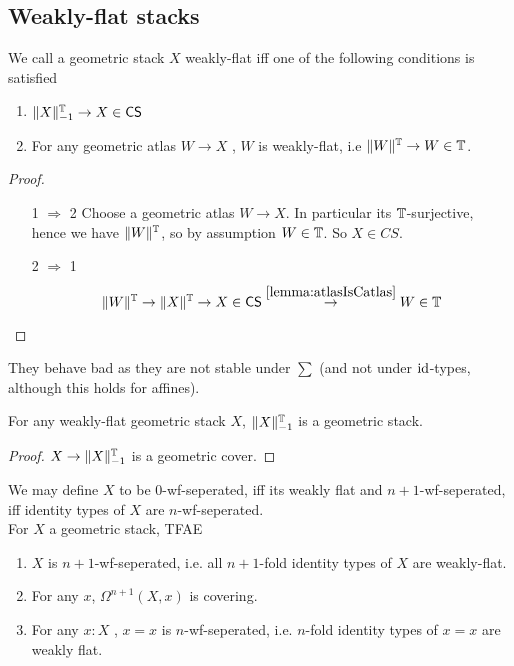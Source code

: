 \documentclass{article}
\newcommand{\CS}{\mathsf{CS}}
\begin{document}
\subsection{Weakly-flat stacks}
\begin{definition}
	We call a geometric stack $X$ weakly-flat iff one of the following conditions is satisfied
	\begin{enumerate}
		\item $\|X\|_{-1}^\bT \to X \in \CS$
		\item For any geometric atlas $W \to X$ , $W$ is weakly-flat, i.e $\|W\|^{\mathbb{T}} \to W \in \mathbb{T}$.
	\end{enumerate}

\end{definition}
\begin{proof}
	\ \begin{enumerate}
		\item [1 $\Rightarrow$ 2] Choose a geometric atlas $W \to X$. In particular its $\mathbb{T}$-surjective, hence we have $\|W\|^{\mathbb{T}}$, so by assumption $W \in \mathbb{T}$. So $X \in CS$.
		\item [2 $\Rightarrow$ 1] 
		\[\|W\|^\bT \to \|X\|^\bT \to X \in \CS \overset{\ref{lemma:atlasIsCatlas}}{\to} W \in \bT \]
	\end{enumerate}
\end{proof}
They behave bad as they are not stable under $\sum$ (and not under $\operatorname{id}$-types, although this holds for affines).
%
\begin{lemma}
For any weakly-flat geometric stack $X$, $\|X\|_{-1}^{\mathbb{T}}$ is a geometric stack.
\end{lemma}
\begin{proof}
	$X \to \|X\|_{-1}^{\mathbb{T}}$ is a geometric cover.
\end{proof}
\begin{prop}{\label{prop:TruncationCover}}
	We may define $X$ to be $0$-wf-seperated, iff its weakly flat and $n+1$-wf-seperated, iff identity types of $X$ are $n$-wf-seperated. \\
	For $X$ a geometric stack, TFAE \begin{enumerate}
		\item  $X$ is $n+1$-wf-seperated, i.e. all $n+1$-fold identity types of $X$ are weakly-flat.
	
		\item For any $x$, $\Omega^{n+1} (X , x)$ is covering.
		\item For any $x: X$ , $x=x$ is $n$-wf-seperated, i.e. $n$-fold identity types of $x=x$ are weakly flat. %
	\end{enumerate}

\end{prop}
\end{document}
